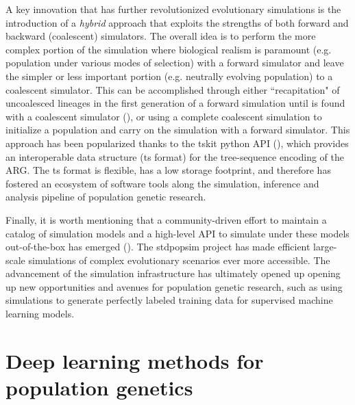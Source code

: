 A key innovation that has further revolutionized evolutionary simulations is the introduction of a \textit{hybrid} approach that exploits the strengths of both forward and backward (coalescent) simulators. The overall idea is to perform the more complex portion of the simulation where biological realism is paramount (e.g. population under various modes of selection) with a forward simulator and leave the simpler or less important portion (e.g. neutrally evolving population) to a coalescent simulator. This can be accomplished through either ``recapitation" of uncoalesced lineages in the first generation of a forward simulation until  is found with a coalescent simulator (\cite{haller_slim_2019}), or using a complete coalescent simulation to initialize a population and carry on the simulation with a forward simulator. This approach has been popularized thanks to the tskit python API (\cite{kelleher2016efficient,kelleher2018efficient}), which provides an interoperable data structure (ts format) for the tree-sequence encoding of the \ac{ARG}. The ts format is flexible, has a low storage footprint, and therefore has fostered an ecosystem of software tools along the simulation, inference and analysis pipeline of population genetic research.

Finally, it is worth mentioning that a community-driven effort to maintain a catalog of simulation models and a high-level API to simulate under these models out-of-the-box has emerged (\cite{adrion_community-maintained_2020,lauterbur_expanding_2022}). The stdpopsim project has made efficient large-scale simulations of complex evolutionary scenarios ever more accessible. The advancement of the simulation infrastructure has ultimately opened up opening up new opportunities and avenues for population genetic research, such as using simulations to generate perfectly labeled training data for supervised machine learning models.

\section{Deep learning methods for population genetics}

